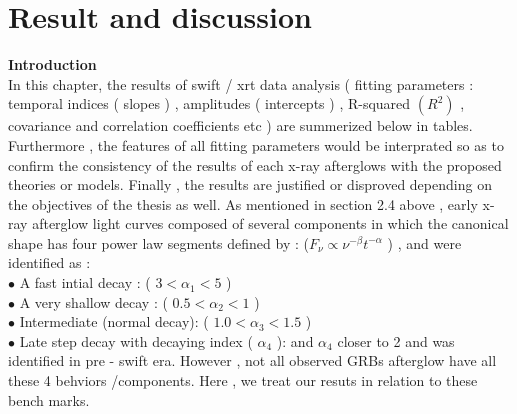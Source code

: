 \setcounter{chapter}{3}
\chapter{Result and discussion }
\textbf{Introduction}\\
In this chapter,  the  results   of  swift / xrt  data  analysis  ( fitting  parameters : temporal indices ( slopes )  ,  amplitudes (  intercepts  ) , R-squared  $( R^{2} )$ , covariance  and  correlation  coefficients  etc  )   are  summerized   below in   tables. Furthermore , the   features  of   all   fitting  parameters   would  be  interprated   so  as   to   confirm  the  consistency   of  the  results of each x-ray afterglows   with   the    proposed   theories  or models. Finally , the  results  are  justified  or  disproved  depending  on  the    objectives  of the  thesis as  well. As  mentioned  in  section 2.4  above ,    early  x-ray  afterglow light curves   composed  of  several components  in  which  the   canonical shape  has  four  power law  segments   defined  by : ($ F_{\nu}\propto \nu^{-\beta}t^{-\alpha} $ ) , and    were identified  as :\\
       $\bullet$ A fast  intial decay  :      ( $ 3 < \alpha_{1} <  5 $ ) \\
       $\bullet$ A very  shallow decay :      ( $ 0.5 < \alpha_{2}< 1 $ )\\
       $\bullet$ Intermediate (normal decay): ( $ 1.0 < \alpha_{3} < 1.5 $ )\\
       $\bullet$ Late  step  decay   with  decaying  index  ( $ \alpha_{4} $ ):  and  $ \alpha_{4} $   closer to 2   and    was   identified   in    pre - swift era. However , not  all  observed  GRBs  afterglow    have  all these  4   behviors   /components. Here , we  treat  our resuts  in  relation  to  these  bench marks.
